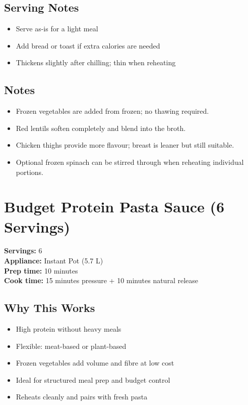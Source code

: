 \documentclass[11pt,a4paper]{article}
\begin{document}
\vspace{0.5em}

\subsection*{Serving Notes}
\begin{itemize}
    \item Serve as-is for a light meal
    \item Add bread or toast if extra calories are needed
    \item Thickens slightly after chilling; thin when reheating
\end{itemize}

\vspace{0.5em}

\subsection*{Notes}
\begin{itemize}
    \item Frozen vegetables are added from frozen; no thawing required.
    \item Red lentils soften completely and blend into the broth.
    \item Chicken thighs provide more flavour; breast is leaner but still suitable.
    \item Optional frozen spinach can be stirred through when reheating individual portions.
\end{itemize}

\section*{Budget Protein Pasta Sauce (6 Servings)}

\textbf{Servings:} 6 \\
\textbf{Appliance:} Instant Pot (5.7 L) \\
\textbf{Prep time:} 10 minutes \\
\textbf{Cook time:} 15 minutes pressure + 10 minutes natural release

\vspace{0.5em}

\subsection*{Why This Works}
\begin{itemize}
    \item High protein without heavy meals
    \item Flexible: meat-based or plant-based
    \item Frozen vegetables add volume and fibre at low cost
    \item Ideal for structured meal prep and budget control
    \item Reheats cleanly and pairs with fresh pasta
\end{itemize}
\end{document}
